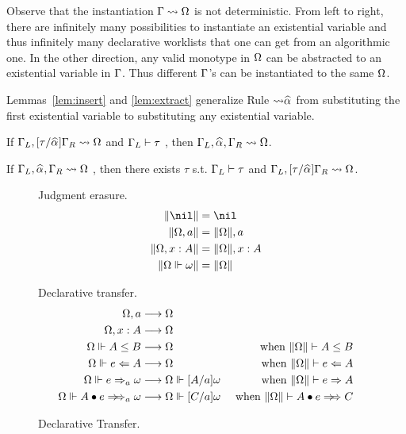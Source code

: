 Observe that the instantiation $\Gamma\rightsquigarrow\Omega$ is not deterministic.
From left to right, there are infinitely many possibilities to instantiate an existential variable and
thus infinitely many declarative worklists that one can get from an algorithmic one.
In the other direction, any valid monotype in $\Omega$ can be abstracted to an
existential variable in $\Gamma$. Thus different $\Gamma$'s can be instantiated to the same
$\Omega$.

Lemmas~\ref{lem:insert} and \ref{lem:extract}
generalize Rule $\mathtt{{\sto}\al}$ from substituting the first existential variable
to substituting any existential variable.

\begin{lemma}[Insert]\label{lem:insert}
If $\Gm_L, [\tau/\al]\Gm_R \sto \Om$ and $\Gamma_L\vdash \tau$
, then $\Gm_L, \al, \Gm_R \sto \Om$.
\end{lemma}
\begin{lemma}[Extract]\label{lem:extract}
If $\Gm_L, \al, \Gm_R \sto \Om$
, then there exists $\tau$ s.t. $\Gamma_L\vdash\tau$ and $\Gm_L, [\tau/\al]\Gm_R \sto \Om$.
\end{lemma}

\begin{figure}[t]
\hfill \framebox{$\|\Om\|$} \hfill Judgment erasure.
\begin{gather*}
\begin{aligned}
\|\nil\| &= \nil\\
\|\Om,a\| &= \|\Om\|, a\\
\|\Om,x:A\| &= \|\Om\|, x:A\\
\|\Om\Vdash\jg\| &= \|\Om\|
\end{aligned}
\end{gather*}

\hfill {} \hfill Declarative transfer.
\begin{gather*}
\begin{aligned}
\Om,a &\rto \Om \\  \Om,x:A & \rto \Om\\
\Om\Vdash A\le B &\rto \Om &\text{ when } \|\Om\| \vdash A\le B\\
\Om\Vdash e\Lto A &\rto \Om & \text{ when } \|\Om\| \vdash e\Lto A\\
\Om\Vdash e\To_a \jg &\rto \Om\Vdash[A/a]\jg & \text{ when } \|\Om\| \vdash e\To A\\
\Om\Vdash \appInfAlg{A}{e} &\rto \Om\Vdash[C/a]\jg & \text{ when } \|\Om\| \vdash \appInf{A}{e}{C}\\
\end{aligned}
\end{gather*}
\caption{Declarative Transfer.}
\label{fig:decl:worklist}
\end{figure}

